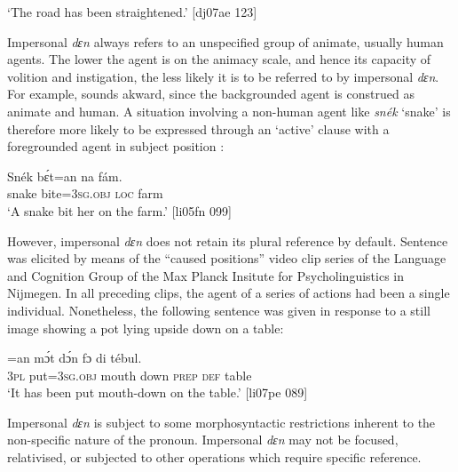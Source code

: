 \glt ‘The road has been straightened.’ [dj07ae 123]
\z

Impersonal \textit{dɛn} always refers to an unspecified group of animate, usually human agents. The lower the agent is on the animacy scale, and hence its capacity of volition and instigation, the less likely it is to be referred to by impersonal \textit{dɛn}. For example,  sounds akward, since the backgrounded agent is construed as animate and human. A situation involving a non-human agent like \textit{snék} ‘snake’ is therefore more likely to be expressed through an ‘active’ clause with a foregrounded agent in subject position : 


\z


\ea%
    \label{ex:key:1346}
    \gll Snék  bɛ́t=an    na  fám.\\
snake  bite=\textsc{3sg.obj}  \textsc{loc}  farm\\

\glt ‘A snake bit her on the farm.’ [li05fn 099]
\z

However, impersonal \textit{dɛn} does not retain its plural reference by default. Sentence  was elicited by means of the “caused positions” video clip series of the Language and Cognition Group of the Max Planck Insitute for Psycholinguistics in Nijmegen. In all preceding clips, the agent of a series of actions had been a single individual. Nonetheless, the following sentence was given in response to a still image showing a pot lying upside down on a table: 


\ea%
    \label{ex:key:1347}
    \gll {}  =an    mɔ́t    dɔ́n    fɔ  di  tébul.\\
\textsc{3pl}  put=\textsc{3sg.obj}  mouth  down  \textsc{prep}  \textsc{def}  table\\

\glt ‘It has been put mouth-down on the table.’ [li07pe 089]
\z

Impersonal \textit{dɛn} is subject to some morphosyntactic restrictions inherent to the non-specific nature of the pronoun. Impersonal \textit{dɛn} may not be focused, relativised, or subjected to other operations which require specific reference. 


